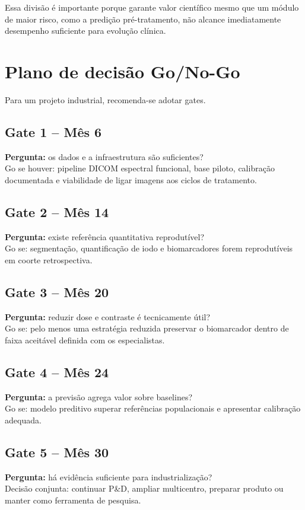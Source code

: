 \documentclass[11pt,a4paper]{article}
\begin{document}
Essa divisão é importante porque garante valor científico mesmo que um módulo de maior risco, como a predição pré-tratamento, não alcance imediatamente desempenho suficiente para evolução clínica.

\section{Plano de decisão Go/No-Go}

Para um projeto industrial, recomenda-se adotar gates.

\subsection*{Gate 1 -- Mês 6}
\textbf{Pergunta:} os dados e a infraestrutura são suficientes?\\
Go se houver: pipeline DICOM espectral funcional, base piloto, calibração documentada e viabilidade de ligar imagens aos ciclos de tratamento.

\subsection*{Gate 2 -- Mês 14}
\textbf{Pergunta:} existe referência quantitativa reprodutível?\\
Go se: segmentação, quantificação de iodo e biomarcadores forem reprodutíveis em coorte retrospectiva.

\subsection*{Gate 3 -- Mês 20}
\textbf{Pergunta:} reduzir dose e contraste é tecnicamente útil?\\
Go se: pelo menos uma estratégia reduzida preservar o biomarcador dentro de faixa aceitável definida com os especialistas.

\subsection*{Gate 4 -- Mês 24}
\textbf{Pergunta:} a previsão agrega valor sobre baselines?\\
Go se: modelo preditivo superar referências populacionais e apresentar calibração adequada.

\subsection*{Gate 5 -- Mês 30}
\textbf{Pergunta:} há evidência suficiente para industrialização?\\
Decisão conjunta: continuar P\&D, ampliar multicentro, preparar produto ou manter como ferramenta de pesquisa.
\end{document}
